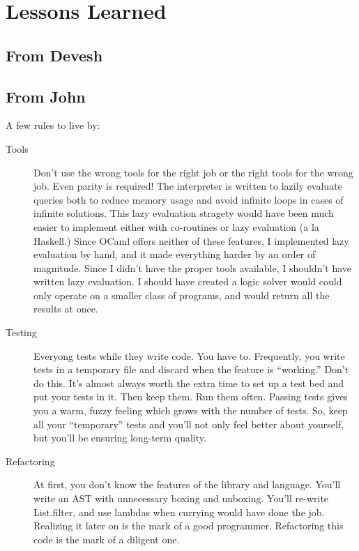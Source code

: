 \documentclass[onecolumn,titlepage]{article}
\begin{document}
\section{Lessons Learned}

\subsection{From Devesh}

\subsection{From John}

A few rules to live by:
\begin{description}
  \item[Tools] Don't use the wrong tools for the right job or the
    right tools for the wrong job.  Even parity is required!  The
    interpreter is written to lazily evaluate queries both to reduce
    memory usage and avoid infinite loops in cases of infinite
    solutions.  This lazy evaluation stragety would have been much
    easier to implement either with co-routines or lazy evaluation (a
    la Haskell.)  Since OCaml offers neither of these features, I
    implemented lazy evaluation by hand, and it made everything harder
    by an order of magnitude.  Since I didn't have the proper tools
    available, I shouldn't have written lazy evaluation.  I should
    have created a logic solver would could only operate on a smaller
    class of programs, and would return all the results at once.

  \item[Testing] Everyong tests while they write code.  You have to.
    Frequently, you write tests in a temporary file and discard when
    the feature is ``working.''  Don't do this.  It's almost always
    worth the extra time to set up a test bed and put your tests in
    it.  Then keep them.  Run them often.  Passing tests gives you a
    warm, fuzzy feeling which grows with the number of tests.  So,
    keep all your ``temporary'' tests and you'll not only feel better
    about yourself, but you'll be ensuring long-term quality.

  \item[Refactoring] At first, you don't know the features of the
    library and language.  You'll write an AST with unnecessary boxing
    and unboxing.  You'll re-write List.filter, and use lambdas when
    currying would have done the job.  Realizing it later on is the
    mark of a good programmer.  Refactoring this code is the mark of a
    diligent one.


\end{description}
\end{document}
